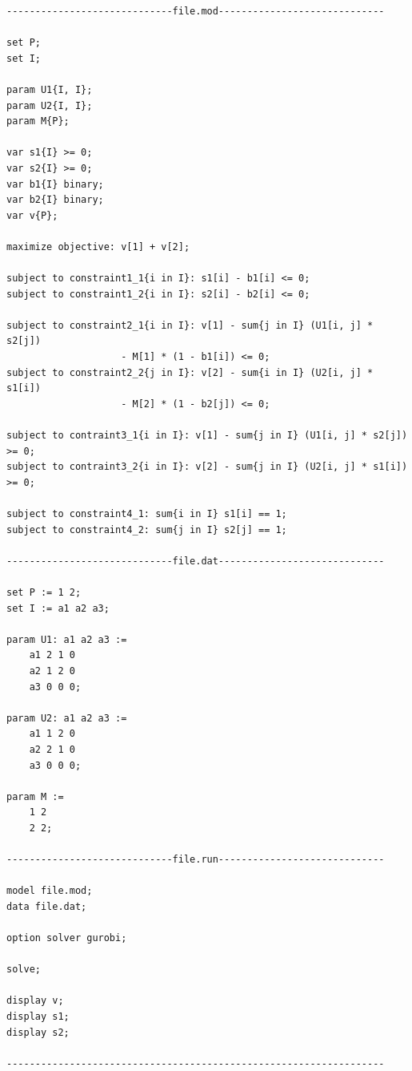 \begin{verbatim}
-----------------------------file.mod-----------------------------

set P;
set I;

param U1{I, I};
param U2{I, I};
param M{P};

var s1{I} >= 0;
var s2{I} >= 0;
var b1{I} binary;
var b2{I} binary;
var v{P};

maximize objective: v[1] + v[2];

subject to constraint1_1{i in I}: s1[i] - b1[i] <= 0;
subject to constraint1_2{i in I}: s2[i] - b2[i] <= 0;

subject to constraint2_1{i in I}: v[1] - sum{j in I} (U1[i, j] * s2[j])
                    - M[1] * (1 - b1[i]) <= 0;
subject to constraint2_2{j in I}: v[2] - sum{i in I} (U2[i, j] * s1[i])
                    - M[2] * (1 - b2[j]) <= 0;
                    
subject to contraint3_1{i in I}: v[1] - sum{j in I} (U1[i, j] * s2[j]) >= 0;
subject to contraint3_2{i in I}: v[2] - sum{j in I} (U2[i, j] * s1[i]) >= 0;

subject to constraint4_1: sum{i in I} s1[i] == 1;
subject to constraint4_2: sum{j in I} s2[j] == 1;

-----------------------------file.dat-----------------------------

set P := 1 2;
set I := a1 a2 a3;

param U1: a1 a2 a3 :=
    a1 2 1 0
    a2 1 2 0
    a3 0 0 0;

param U2: a1 a2 a3 :=
    a1 1 2 0
    a2 2 1 0
    a3 0 0 0;
    
param M :=
    1 2
    2 2;

-----------------------------file.run-----------------------------

model file.mod;
data file.dat;

option solver gurobi;

solve;

display v;
display s1;
display s2;

------------------------------------------------------------------
\end{verbatim}

